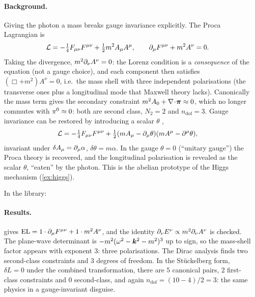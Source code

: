 
\paragraph{Background.} Giving the photon a mass breaks gauge invariance explicitly. The Proca Lagrangian \cite{Proca1936} is
\begin{equation}
\mathcal L=-\tfrac14F_{\mu\nu}F^{\mu\nu}+\tfrac12m^2A_\mu A^\mu,\qquad
\partial_\mu F^{\mu\nu}+m^2A^\nu=0.
\end{equation}
Taking the divergence, $m^2\partial_\nu A^\nu=0$: the Lorenz condition is a \emph{consequence} of the equation (not a gauge choice), and each component then satisfies $(\Box+m^2)A^\nu=0$, i.e.\ the mass shell with three independent polarisations (the transverse ones plus a longitudinal mode that Maxwell theory lacks). Canonically the mass term gives the secondary constraint $m^2A_0+\nabla\!\cdot\!\bm{\pi}\approx0$, which no longer commutes with $\pi^0\approx0$: both are second class, $N_2=2$ and $n_{\mathrm{dof}}=3$. Gauge invariance can be restored by introducing a scalar $\theta$ \cite{Stueckelberg1938},
\begin{equation}
\mathcal L=-\tfrac14F_{\mu\nu}F^{\mu\nu}+\tfrac12(mA_\mu-\partial_\mu\theta)(mA^\mu-\partial^\mu\theta),
\end{equation}
invariant under $\delta A_\mu=\partial_\mu\alpha$, $\delta\theta=m\alpha$. In the gauge $\theta=0$ (``unitary gauge'') the Proca theory is recovered, and the longitudinal polarisation is revealed as the scalar $\theta$, ``eaten'' by the photon. This is the abelian prototype of the Higgs mechanism (\cref{ex:higgs}).

In the library:


\paragraph{Results.}  gives $\text{EL}=1\cdot\partial_\mu F^{\mu\nu}+1\cdot m^2A^\nu$, and the identity $\partial_\nu E^\nu\propto m^2\partial_\nu A^\nu$ is checked. The plane-wave determinant is $-m^2(\omega^2-\bm{k}^2-m^2)^3$ up to sign, so the mass-shell factor appears with exponent $3$: three polarisations. The Dirac analysis finds two second-class constraints and $3$ degrees of freedom. In the St\"uckelberg form, $\delta L=0$ under the combined transformation, there are $5$ canonical pairs, $2$ first-class constraints and $0$ second-class, and again $n_{\mathrm{dof}}=(10-4)/2=3$: the same physics in a gauge-invariant disguise.

